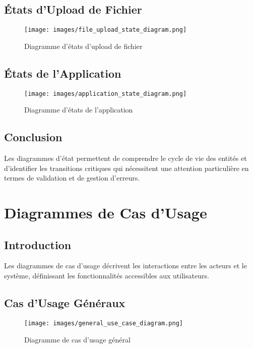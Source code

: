 \subsection{États d'Upload de Fichier}

\begin{figure}[H]
    \centering
    \texttt{[image: images/file\_upload\_state\_diagram.png]}
    \caption{Diagramme d'états d'upload de fichier}
    \label{fig:file_upload_state}
\end{figure}

\subsection{États de l'Application}

\begin{figure}[H]
    \centering
    \texttt{[image: images/application\_state\_diagram.png]}
    \caption{Diagramme d'états de l'application}
    \label{fig:application_state}
\end{figure}

\subsection{Conclusion}

Les diagrammes d'état permettent de comprendre le cycle de vie des entités et d'identifier les transitions critiques qui nécessitent une attention particulière en termes de validation et de gestion d'erreurs.

\section{Diagrammes de Cas d'Usage}

\subsection{Introduction}

Les diagrammes de cas d'usage décrivent les interactions entre les acteurs et le système, définissant les fonctionnalités accessibles aux utilisateurs.

\subsection{Cas d'Usage Généraux}

\begin{figure}[H]
    \centering
    \texttt{[image: images/general\_use\_case\_diagram.png]}
    \caption{Diagramme de cas d'usage général}
    \label{fig:general_use_case}
\end{figure}

